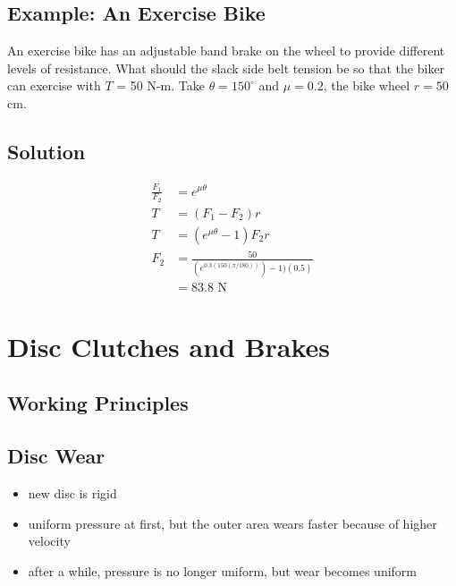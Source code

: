 \documentclass[
10pt,
a4paper,
openany,
svgnames,
]{book}
\begin{document}
\subsection*{Example: An Exercise Bike}
\label{sec:org6a82f69}

An exercise bike has an adjustable band brake on the wheel to provide different levels of resistance. What should the slack side belt tension be so that the biker can exercise with \(T\) = 50 N-m. Take \(\theta = 150^{\circ}\) and \(\mu = 0.2\), the bike wheel \(r = 50\) cm.

\subsection*{Solution}
\label{sec:org865c77f}

\begin{align*}
    \frac{F_1}{F_2} &= e^{\mu\theta} \\
    T &= (F_1 - F_2)r \\
    T &= (e^{\mu \theta} - 1) F_2 r \\
    F_2 &= \frac{50}{(e^{0.3(150(\pi/180))}) - 1)(0.5)} \\
        &= 83.8 \text{ N}
\end{align*}

\section*{Disc Clutches and Brakes}
\label{sec:org14330e4}

\subsection*{Working Principles}
\label{sec:org0a382c7}

\begin{center}
\end{center}

\subsection*{Disc Wear}
\label{sec:org0252355}

\begin{itemize}
\item new disc is rigid
\item uniform pressure at first, but the outer area wears faster because of higher velocity
\item after a while, pressure is no longer uniform, but wear becomes uniform
\end{itemize}
\end{document}

